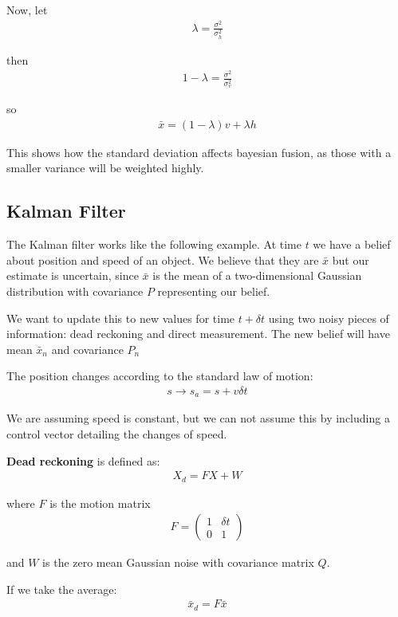 \documentclass[11pt,a4paper,titlepage,dvipsnames,cmyk]{scrartcl}
\begin{document}
Now, let
\begin{align*}
\lambda = \frac{\sigma^2}{\sigma_h^2}
\end{align*}

then
\begin{align*}
1-\lambda = \frac{\sigma^2}{\sigma_v^2}
\end{align*}

so
\begin{align*}
\bar x = (1-\lambda)v + \lambda h
\end{align*}

This shows how the standard deviation affects bayesian fusion, as those with a smaller variance will be weighted highly.

\subsection{Kalman Filter}
The Kalman filter works like the following example. At time $t$ we have a belief about position and speed of an object. We believe that they are $\bar x$ but our estimate is uncertain, since $\bar x$ is the mean of a two-dimensional Gaussian distribution with covariance $P$ representing our belief.

We want to update this to new values for time $t + \delta t$ using two noisy pieces of information: dead reckoning and direct measurement. The new belief will have mean $\bar x_n$ and covariance $P_n$

The position changes according to the standard law of motion:
\begin{align*}
s \rightarrow s_a = s + v \delta t
\end{align*}

We are assuming speed is constant, but we can not assume this by including a control vector detailing the changes of speed.

\textbf{Dead reckoning} is defined as:
\begin{align*}
X_d = FX + W
\end{align*}

where $F$ is the motion matrix
\begin{align*}
F = \begin{pmatrix}
    1 & \delta t \\
    0 & 1
\end{pmatrix}
\end{align*}

and $W$ is the zero mean Gaussian noise with covariance matrix $Q$.

If we take the average:
\begin{align*}
\bar x_d = F \bar x
\end{align*}
\end{document}
